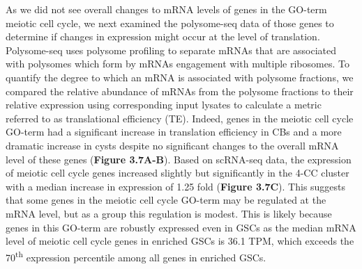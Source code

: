 \documentclass[12pt,oneside]{reedthesis}
\begin{document}
As we did not see overall changes to mRNA levels of genes in the GO-term
meiotic cell cycle, we next examined the polysome-seq data of those
genes to determine if changes in expression might occur at the level of
translation. Polysome-seq uses polysome profiling to separate mRNAs that
are associated with polysomes which form by mRNAs engagement with
multiple ribosomes. To quantify the degree to which an mRNA is
associated with polysome fractions, we compared the relative abundance
of mRNAs from the polysome fractions to their relative expression using
corresponding input lysates to calculate a metric referred to as
translational efficiency (TE). Indeed, genes in the meiotic cell cycle
GO-term had a significant increase in translation efficiency in CBs and
a more dramatic increase in cysts despite no significant changes to the
overall mRNA level of these genes (\textbf{Figure 3.7A-B}).
Based on scRNA-seq data, the expression of meiotic cell cycle genes
increased slightly but significantly in the 4-CC cluster with a median
increase in expression of 1.25 fold (\textbf{Figure 3.7C}). This
suggests that some genes in the meiotic cell cycle GO-term may be
regulated at the mRNA level, but as a group this regulation is modest.
This is likely because genes in this GO-term are robustly expressed even
in GSCs as the median mRNA level of meiotic cell cycle genes in enriched
GSCs is 36.1 TPM, which exceeds the 70\textsuperscript{th} expression percentile among
all genes in enriched GSCs.
\end{document}
